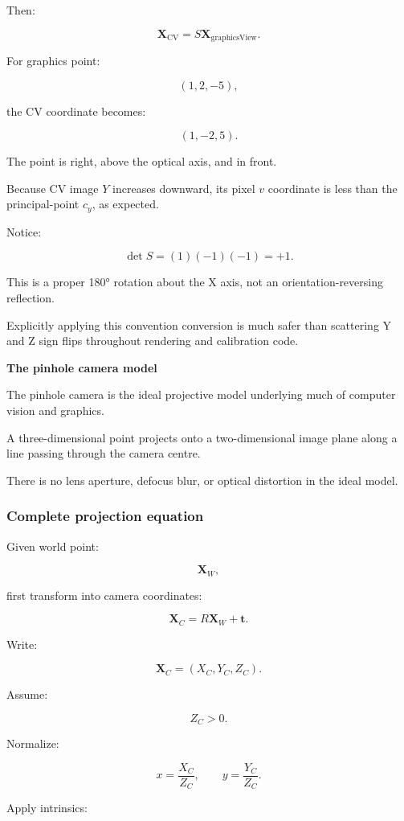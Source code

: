 Then:

\[
 \boxed{ \mathbf X_{\mathrm{CV}}=S\mathbf X_{\mathrm{graphicsView}} }.
\]

For graphics point:

\[
 (1,2,-5),
\]

the CV coordinate becomes:

\[
 \boxed{(1,-2,5)}.
\]

The point is right, above the optical axis, and in front.

Because CV image \(Y\) increases downward, its pixel \(v\) coordinate is less than the principal-point \(c_y\), as expected.

Notice:

\[
 \det S=(1)(-1)(-1)=+1.
\]

This is a proper 180° rotation about the X axis, not an orientation-reversing reflection.

Explicitly applying this convention conversion is much safer than scattering Y and Z sign flips throughout rendering and calibration code.

\textbf{The pinhole camera model}

The pinhole camera is the ideal projective model underlying much of computer vision and graphics.

A three-dimensional point projects onto a two-dimensional image plane along a line passing through the camera centre.

There is no lens aperture, defocus blur, or optical distortion in the ideal model.

\subsubsection{Complete projection equation}\label{complete-projection-equation}

Given world point:

\[
 \mathbf X_W,
\]

first transform into camera coordinates:

\[
 \boxed{ \mathbf X_C=R\mathbf X_W+\mathbf t }.
\]

Write:

\[
 \mathbf X_C=(X_C,Y_C,Z_C).
\]

Assume:

\[
 Z_C>0.
\]

Normalize:

\[
 \boxed{ x=\frac{X_C}{Z_C}, \qquad y=\frac{Y_C}{Z_C} }.
\]

Apply intrinsics:

